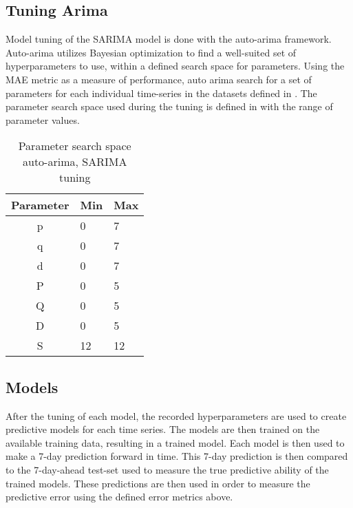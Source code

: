   \subsection{Tuning Arima}
  Model tuning of the SARIMA model is done with the auto-arima framework.
  Auto-arima utilizes Bayesian optimization to find a well-suited set of hyperparameters to use,
  within a defined search space for parameters.
  Using the MAE metric as a measure of performance, auto arima search for a set of parameters for each individual time-series
  in the datasets defined in .
  The parameter search space used during the tuning is defined in  with the range of parameter values.

  \begin{table}[h]
    \centering
    \caption{Parameter search space auto-arima, SARIMA tuning}
    \label{table:method:arima-tuning}
    \begin{tabular}{|c|l|l|}\hline
      Parameter & Min & Max \\ \hline
      p         & 0   & 7   \\ \hline
      q         & 0   & 7   \\ \hline
      d         & 0   & 7   \\ \hline
      P         & 0   & 5   \\ \hline
      Q         & 0   & 5   \\ \hline
      D         & 0   & 5   \\ \hline
      S         & 12  & 12  \\ \hline
    \end{tabular}
  \end{table}


  \subsection{Models}

  After the tuning of each model, the recorded hyperparameters are used to create predictive models for each time series.
  The models are then trained on the available training data, resulting in a trained model.
  Each model is then used to make a 7-day prediction forward in time.
  This 7-day prediction is then compared to the 7-day-ahead test-set used to measure the true predictive ability of the trained models.
  These predictions are then used in order to measure the predictive error using the defined error metrics above.



